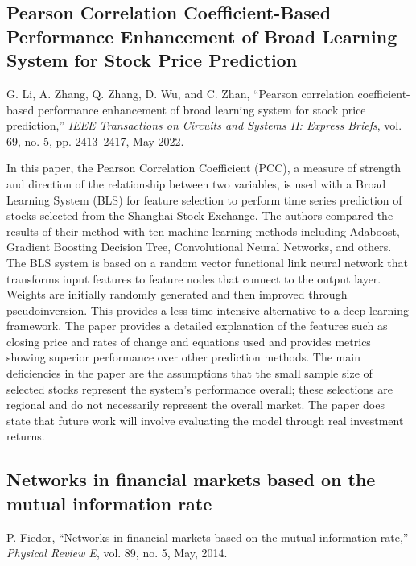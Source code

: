 \documentclass[12pt]{article}
\begin{document}
%



\subsection{Pearson Correlation Coefficient-Based Performance Enhancement of Broad Learning System for Stock Price Prediction}
G. Li, A. Zhang, Q. Zhang, D. Wu, and C. Zhan, “Pearson correlation coefficient-based performance enhancement of broad learning system for stock price prediction,” \textit{IEEE Transactions on Circuits and Systems II: Express Briefs}, vol. 69, no. 5, pp. 2413–2417, May 2022. %
\newline

In this paper, the Pearson Correlation Coefficient (PCC), a measure of strength and direction of the relationship between two variables, is used with a Broad Learning System (BLS) for feature selection to perform time series prediction of stocks selected from the Shanghai Stock Exchange. The authors compared the results of their method with ten machine learning methods including Adaboost, Gradient Boosting Decision Tree, Convolutional Neural Networks, and others. The BLS system is based on a random vector functional link neural network that transforms input features to feature nodes that connect to the output layer. Weights are initially randomly generated and then improved through pseudoinversion. This provides a less time intensive alternative to a deep learning framework. The paper provides a detailed explanation of the features such as closing price and rates of change and equations used and provides metrics showing superior performance over other prediction methods. The main deficiencies in the paper are the assumptions that the small sample size of selected stocks represent the system's performance overall; these selections are regional and do not necessarily represent the overall market. The paper does state that future work will involve evaluating the model through real investment returns.


\subsection{Networks in financial markets based on the mutual information rate}
P. Fiedor, “Networks in financial markets based on the mutual information rate,” \textit{Physical Review E}, vol. 89, no. 5, May, 2014. %
\newline
\end{document}
